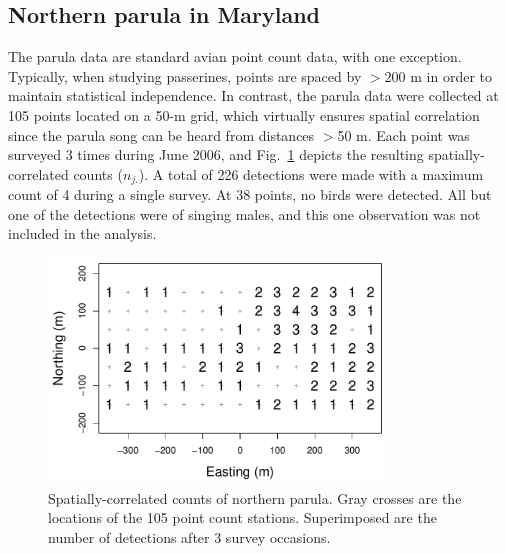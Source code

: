
\subsection{Northern parula in Maryland}

The parula data are standard avian point count data, with one
exception. Typically, when studying
passerines, points are spaced by $>200$ m in order to maintain
statistical independence. In contrast,
the parula data were collected at
105 points located on a 50-m grid, which virtually ensures spatial
correlation since the parula song can be heard from distances $>$50 m.
Each point was surveyed 3 times during June 2006, and
Fig.~\ref{fig:nopaDat} depicts the resulting spatially-correlated
counts ($n_{j.}$). A total of 226 detections were made with a maximum
count of 4 during a single survey. At 38 points, no birds were
detected. All but one of the detections were of singing males, and
this one observation was not included in the analysis.

\begin{figure}
  \centering
  \includegraphics[width=0.8\textwidth]{Ch18-Unmarked/figs/nopaCounts}
  \caption{Spatially-correlated counts of northern parula. Gray
    crosses are the locations of the 105 point count
    stations. Superimposed are the number of detections after 3 survey occasions.}
  \label{fig:nopaDat}
\end{figure}

